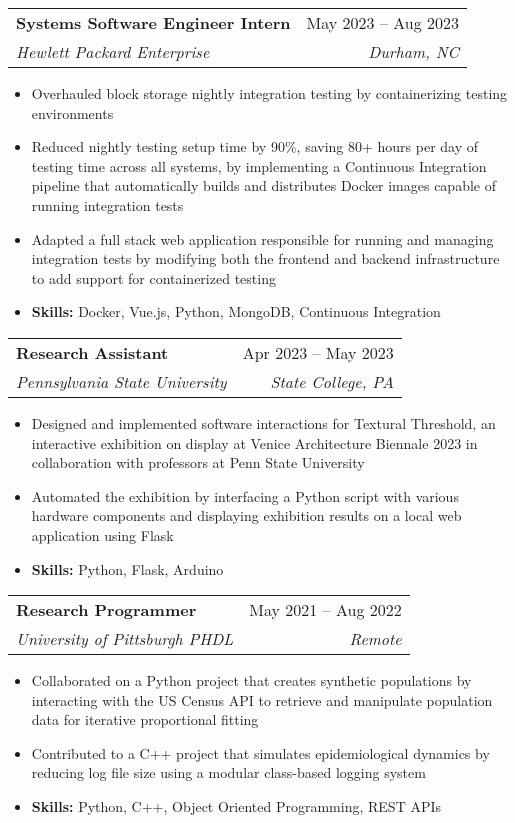 \documentclass[letterpaper,11pt]{article}
\makeatletter
\newcommand{\resumeItem}[1]{
  \item\small{
    {#1 \vspace{-2pt}}
  }
}
\newcommand{\resumeSubheading}[4]{
  \vspace{-2pt}\item
    \begin{tabular*}{0.97\textwidth}[t]{l@{\extracolsep{\fill}}r}
      \textbf{#1} & #2 \\
      \textit{\small#3} & \textit{\small #4} \\
    \end{tabular*}\vspace{-7pt}
}
\newcommand{\resumeSubSubheading}[2]{
    \item
    \begin{tabular*}{0.97\textwidth}{l@{\extracolsep{\fill}}r}
      \textit{\small#1} & \textit{\small #2} \\
    \end{tabular*}\vspace{-7pt}
}
\newcommand{\resumeSubHeadingListEnd}{\end{itemize}}
\newcommand{\resumeItemListStart}{\begin{itemize}}
\newcommand{\resumeItemListEnd}{\end{itemize}\vspace{-5pt}}
\makeatother
\begin{document}

    \resumeSubheading
      {Systems Software Engineer Intern}{May 2023 -- Aug 2023}
      {Hewlett Packard Enterprise}{Durham, NC}
      \resumeItemListStart
        \resumeItem{Overhauled block storage nightly integration testing by containerizing testing environments}
        \resumeItem{Reduced nightly testing setup time by 90\%, saving 80+ hours per day of testing time across all systems, by implementing a Continuous Integration pipeline that automatically builds and distributes Docker images capable of running integration tests}
        \resumeItem{Adapted a full stack web application responsible for running and managing integration tests by modifying both the frontend and backend infrastructure to add support for containerized testing}
        \resumeItem{{\bf Skills:} Docker, Vue.js, Python, MongoDB, Continuous Integration}
    \resumeItemListEnd

    \resumeSubheading
      {Research Assistant}{Apr 2023 -- May 2023}
      {Pennsylvania State University}{State College, PA}
      \resumeItemListStart
        \resumeItem{Designed and implemented software interactions for Textural Threshold, an interactive exhibition on display at Venice Architecture Biennale 2023 in collaboration with professors at Penn State University}
        \resumeItem{Automated the exhibition by interfacing a Python script with various hardware components and displaying exhibition results on a local web application using Flask}
        \resumeItem{{\bf Skills:} Python, Flask, Arduino}
    \resumeItemListEnd

    \resumeSubheading
      {Research Programmer}{May 2021 -- Aug 2022}
      {University of Pittsburgh PHDL}{Remote}
      \resumeItemListStart
        \resumeItem{Collaborated on a Python project that creates synthetic populations by interacting with the US Census API to retrieve and manipulate population data for iterative proportional fitting}
        \resumeItem{Contributed to a C++ project that simulates epidemiological dynamics by reducing log file size using a modular class-based logging system}
        \resumeItem{{\bf Skills:} Python, C++, Object Oriented Programming, REST APIs}
      \resumeItemListEnd
\end{document}
